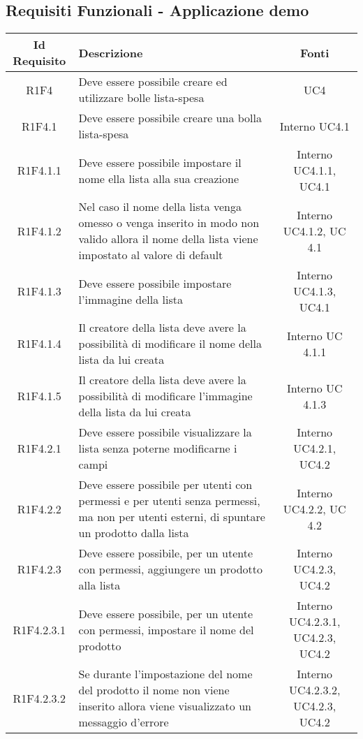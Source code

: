 \newpage
\subsection{Requisiti Funzionali - Applicazione demo}
\normalsize
\begingroup
\renewcommand\arraystretch{2}
\begin{longtable}{|c|>{\centering}m{7cm}|c|}
\hline
\textbf{Id Requisito} & \textbf{Descrizione} & \textbf{Fonti}\\
\hline
\endhead
			R1F4 & Deve essere possibile creare ed utilizzare bolle lista-spesa  & UC4 \\
			\hline
			R1F4.1 & Deve essere possibile creare una bolla lista-spesa & Interno UC4.1 \\
			\hline
			R1F4.1.1 & Deve essere possibile impostare il nome ella lista alla sua creazione & Interno UC4.1.1, UC4.1 \\
			\hline
			R1F4.1.2 & Nel caso il nome della lista venga omesso o venga inserito in modo non valido allora il nome della lista viene impostato al valore di default & Interno UC4.1.2, UC 4.1 \\
			\hline
			R1F4.1.3 & Deve essere possibile impostare l'immagine della lista & Interno UC4.1.3, UC4.1 \\
			\hline
			R1F4.1.4 & Il creatore della lista deve avere la possibilità di modificare il nome della lista da lui creata & Interno UC 4.1.1 \\
			\hline
			R1F4.1.5 & Il creatore della lista deve avere la possibilità di modificare l'immagine della lista da lui creata & Interno UC 4.1.3 \\
			\hline
			R1F4.2.1 & Deve essere possibile visualizzare la lista senza poterne modificarne i campi & Interno UC4.2.1, UC4.2 \\
			\hline
			R1F4.2.2 & Deve essere possibile per utenti con permessi e per utenti senza permessi, ma non per utenti esterni, di spuntare un prodotto dalla lista & Interno UC4.2.2, UC 4.2 \\
			\hline
			R1F4.2.3 & Deve essere possibile, per un utente con permessi, aggiungere un prodotto alla lista & Interno UC4.2.3, UC4.2 \\
			\hline
			R1F4.2.3.1 & Deve essere possibile, per un utente con permessi, impostare il nome del prodotto & Interno UC4.2.3.1, UC4.2.3, UC4.2 \\
			\hline
			R1F4.2.3.2 & Se durante l'impostazione del nome del prodotto il nome non viene inserito allora viene visualizzato un messaggio d'errore & Interno UC4.2.3.2, UC4.2.3, UC4.2 \\

\end{longtable}
